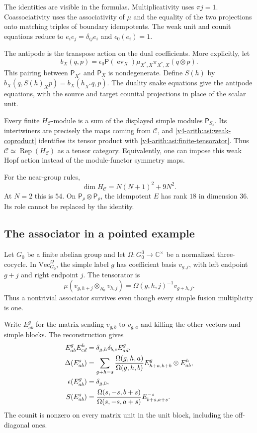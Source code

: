 The identities are visible in the formulas. Multiplicativity uses
$\pi j=1$. Coassociativity uses the associativity of $\mu$ and
the equality of the two projections onto matching triples of boundary
idempotents. The weak unit and counit equations reduce to
$e_ie_j=\delta_{ij}e_i$ and $\epsilon_0(e_i)=1$.

The antipode is the transpose action on the dual coefficients.
More explicitly, let
\[
 b_X(q,p)=\epsilon_0\mathsf P(\operatorname{ev}_X)
               \mu_{X^*,X}\pi_{X^*,X}(q\otimes p).
\]
This pairing between $\mathsf P_{X^*}$ and $\mathsf P_X$ is
nondegenerate. Define $S(h)$ by
$b_X(q,S(h)_Xp)=b_X(h_{X^*}q,p)$.
The duality snake equations give the antipode equations, with the
source and target counital projections in place of the scalar unit.

Every finite $H_{\mathcal C}$-module is a sum of the displayed simple
modules $\mathsf P_{S_s}$. Its intertwiners are precisely the maps
coming from $\mathcal C$, and \eqref{v4-arith:asi:weak-coproduct} identifies
its tensor product with \eqref{v4-arith:asi:finite-tensorator}.
Thus $\mathcal C\simeq\operatorname{Rep}(H_{\mathcal C})$ as a
tensor category. Equivalently, one can impose this weak Hopf action
instead of the module-functor symmetry maps.

For the near-group rules,
\[
 \dim H_{\mathcal C}=N(N+1)^2+9N^2.
\]
At $N=2$ this is $54$. On
$\mathsf P_\rho\otimes\mathsf P_\rho$, the idempotent $E$ has rank
$18$ in dimension $36$. Its role cannot be replaced by the identity.

\subsection{The associator in a pointed example}
\label{v4-arith:asi:pointed}

Let \(G_0\) be a finite abelian group and let
\(\Omega:G_0^3\to\mathbb C^\times\) be a normalized three-cocycle.
In \(\mathrm{Vec}_{G_0}^{\Omega}\), the simple label \(g\) has
coefficient basis \(v_{g,j}\), with left endpoint \(g+j\) and
right endpoint \(j\). The tensorator is
\[
 \mu(v_{g,h+j}\otimes_{R_0}v_{h,j})
       =\Omega(g,h,j)^{-1}v_{g+h,j}.
\]
Thus a nontrivial associator survives even though every simple
fusion multiplicity is one.

Write \(E^g_{ab}\) for the matrix sending \(v_{g,b}\) to
\(v_{g,a}\) and killing the other vectors and simple blocks.
The reconstruction gives
\begin{align}
 E^g_{ab}E^h_{cd}
   &=\delta_{g,h}\delta_{b,c}E^g_{ad},\notag\\
 \Delta(E^s_{ab})
   &=\sum_{g+h=s}
      \frac{\Omega(g,h,a)}{\Omega(g,h,b)}
      E^g_{h+a,h+b}\otimes E^h_{ab},
       \label{v4-arith:asi:pointed-coproduct}\\
 \epsilon(E^g_{ab})&=\delta_{g,0},\notag\\
 S(E^s_{ab})
   &=\frac{\Omega(s,-s,b+s)}{\Omega(s,-s,a+s)}
         E^{-s}_{b+s,a+s}.\notag
\end{align}
The counit is nonzero on every matrix unit in the unit block,
including the off-diagonal ones.

